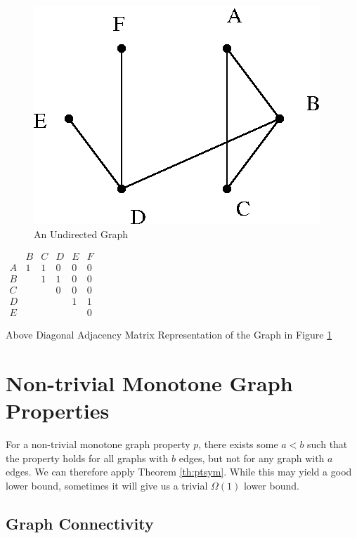 \begin{figure}
\begin{center}
\includegraphics{figures/sample_graph.eps}
\caption{An Undirected Graph \label{fi:graph}}
\end{center}
\end{figure}


\begin{table}
\begin{center}
\(\begin{array}{cccccc}
	  & B & C & D & E & F \\ A & 1 & 1 & 0 & 0 & 0 \\ B & & 1 & 1
	  & 0 & 0 \\ C & & & 0 & 0 & 0 \\ D & & & & 1 & 1 \\ E & & & &
	  & 0
\end{array}\)
\caption{Above Diagonal Adjacency Matrix Representation of the Graph in Figure \protect\ref{fi:graph} \label{tbl:graph}}
\end{center}
\end{table}

\section{Non-trivial Monotone Graph Properties}
\label{sec:lqbnmgp}	

For a non-trivial monotone graph property $p$, there exists some $a <
b$ such that the property holds for all graphs with $b$ edges, but not
for any graph with $a$ edges.  We can therefore apply Theorem
\ref{th:ptsym}.  While this may yield a good lower bound, sometimes it
will give us a trivial $\Omega(1)$ lower bound.

\subsection{Graph Connectivity}
\label{sec:gc}

